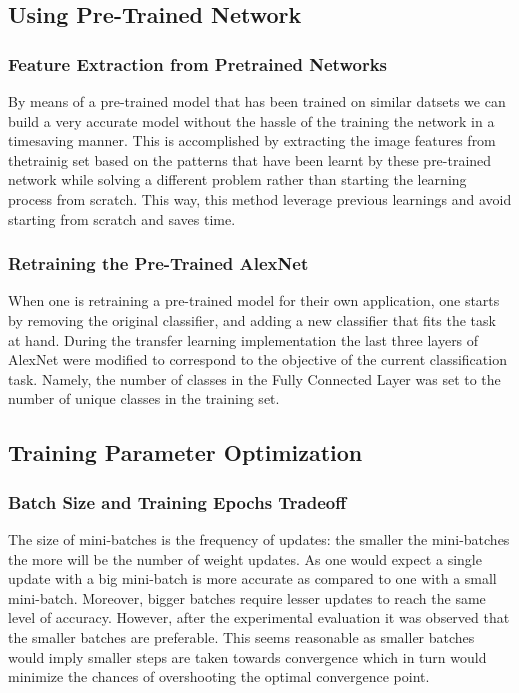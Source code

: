 \documentclass[doc/report.tex]{subfiles}
\begin{document}
\subsection{Using Pre-Trained Network}

\subsubsection{Feature Extraction from Pretrained Networks}
By means of a pre-trained model that has been trained on similar datsets we can
build a very accurate model without the hassle of the training the network in a
timesaving manner. This is accomplished by extracting the image features from
thetrainig set based on the patterns that have been learnt by these pre-trained
network while solving a different problem rather than starting the learning
process from scratch. This way, this method leverage previous learnings and
avoid starting from scratch and saves time.

\subsubsection{Retraining the Pre-Trained AlexNet}
When one is retraining a pre-trained model for their own application, one
starts by removing the original classifier, and adding a new classifier that
fits the task at hand. During the transfer learning implementation the last
three layers of AlexNet were modified to correspond to the objective of the
current classification task. Namely, the number of classes in the Fully
Connected Layer was set to the number of unique classes in the training set.

\subsection{Training Parameter Optimization}

\subsubsection{Batch Size and Training Epochs Tradeoff}
The size of mini-batches is the frequency of updates: the smaller the
mini-batches the more will be the number of weight updates. As one would expect
a single update with a big mini-batch is more accurate as compared to one with
a small mini-batch. Moreover, bigger batches require lesser updates to reach
the same level of accuracy. However, after the experimental evaluation it was
observed that the smaller batches are preferable. This seems reasonable as
smaller batches would imply smaller steps are taken towards convergence which
in turn would minimize the chances of overshooting the optimal convergence
point.
\end{document}
